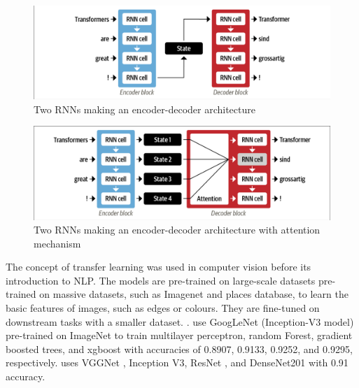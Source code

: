 \begin{figure}[H]
\begin{center}
  \includegraphics[width=\columnwidth, trim={0.1cm 0.1cm 0.1cm 0.1cm},clip]{./images/encoder-decoder_rnn.png}
\end{center}
\caption{Two \ac{RNN}s making an encoder-decoder architecture \cite{tunstallNaturalLanguageProcessing2022}}
\label{fig:rnn_encoder_decoder}
\end{figure}

\begin{figure}[H]
\begin{center}
  \includegraphics[width=\columnwidth,trim={0.1cm 0.1cm 0.1cm 0.1cm},clip]{./images/encoder-decoder_rnn_attention.png}
\end{center}
\caption{Two \ac{RNN}s making an encoder-decoder architecture with attention mechanism \cite{tunstallNaturalLanguageProcessing2022}}
\label{fig:rnn_encoder_decoder_attention}
\end{figure}

The concept of transfer learning was used in computer vision before its introduction to \ac{NLP}.
The models are pre-trained on large-scale datasets pre-trained on massive datasets, such as Imagenet
\cite{krizhevskyImageNetClassificationDeep2017} and places database,
\cite{zhouLearningDeepFeatures2014} to learn the basic features of images, such as
edges or colours. They are fine-tuned on downstream tasks with a smaller dataset. 
.  use GoogLeNet
(Inception-V3 model) \cite{7780677} pre-trained on ImageNet to train multilayer perceptron, random
Forest, gradient boosted trees, and  xgboost with accuracies of 0.8907, 0.9133, 0.9252, and 0.9295,
respectively.  uses VGGNet
\cite{simonyanVeryDeepConvolutional2015}, Inception V3, ResNet \cite{heDeepResidualLearning2015},
and DenseNet201 \cite{huangDenselyConnectedConvolutional2018} with 0.91 accuracy.


